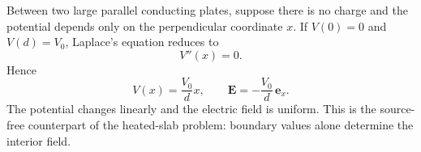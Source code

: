 \begin{example}
Between two large parallel conducting plates, suppose there is no charge and the potential depends only on the perpendicular coordinate $x$. If $V(0)=0$ and $V(d)=V_0$, Laplace's equation reduces to
\begin{equation}
V''(x)=0.
\end{equation}
Hence
\begin{equation}
V(x)=\frac{V_0}{d}x,
\qquad
\mathbf{E}=-\frac{V_0}{d}\,\mathbf{e}_x.
\end{equation}
The potential changes linearly and the electric field is uniform. This is the source-free counterpart of the heated-slab problem: boundary values alone determine the interior field.
\end{example}